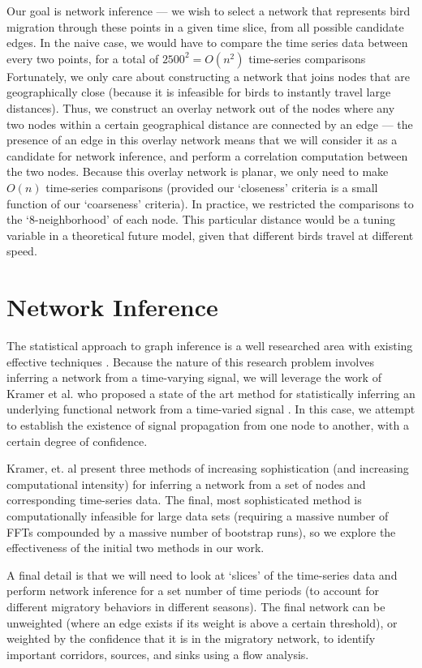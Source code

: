 \documentclass{article} %
\begin{document}
Our goal is network inference --- we wish to select a network that represents bird migration through these points in a given time slice, from all possible candidate edges. In the naive case, we would have to compare the time series data between every two points, for a total of $2500^2 = O(n^2)$ time-series comparisons Fortunately, we only care about constructing a network that joins nodes that are geographically close (because it is infeasible for birds to instantly travel large distances). Thus, we construct an overlay network out of the nodes where any two nodes within a certain geographical distance are connected by an edge --- the presence of an edge in this overlay network means that we will consider it as a candidate for network inference, and perform a correlation computation between the two nodes. Because this overlay network is planar, we only need to make $O(n)$ time-series comparisons (provided our `closeness' criteria is a small function of our `coarseness' criteria). In practice, we restricted the comparisons to the `8-neighborhood' of each node. This particular distance would be a tuning variable in a theoretical future model, given that different birds travel at different speed. 

\section{Network Inference} 
The statistical approach to graph inference is a well researched area with existing effective techniques \cite{AlbertMechanics}. Because the nature of this research problem involves inferring a network from a time-varying signal, we will leverage the work of Kramer et al. who proposed a state of the art method for statistically inferring an underlying functional network from a time-varied signal \cite{kramer}. In this case, we attempt to establish the existence of signal propagation from one node to another, with a certain degree of confidence. 

Kramer, et. al present three methods of increasing sophistication (and increasing computational intensity) for inferring a network from a set of nodes and corresponding time-series data. The final, most sophisticated method is computationally infeasible for large data sets (requiring a massive number of FFTs compounded by a massive number of bootstrap runs), so we explore the effectiveness of the initial two methods in our work. 

A final detail is that we will need to look at `slices' of the time-series data and perform network inference for a set number of time periods (to account for different migratory behaviors in different seasons). The final network can be unweighted (where an edge exists if its weight is above a certain threshold), or weighted by the confidence that it is in the migratory network, to identify important corridors, sources, and sinks using a flow analysis. 
\end{document}
